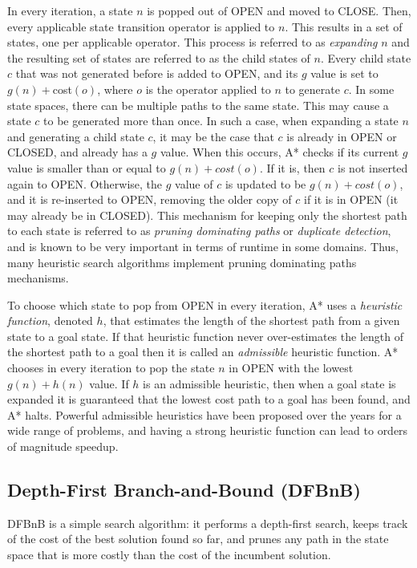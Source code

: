 \documentclass[letterpaper]{article} %
\begin{document}
In every iteration, a state $n$ is popped out of OPEN and moved to CLOSE. Then, every applicable state transition operator is applied to $n$. This results in a set of states, one per applicable operator. This process is referred to as \emph{expanding} $n$ and the resulting set of states are referred to as the child states of $n$.
Every child state $c$ that was not generated before is added to OPEN, and its $g$ value is set to  $g(n)+$cost$(o)$, where $o$ is the operator applied to $n$ to generate $c$.
In some state spaces, there can be multiple paths to the same state.
This may cause a state $c$ to be generated more than once.
In such a case, when expanding a state $n$ and generating a child state $c$, it may be the case that $c$ is already in OPEN or CLOSED, and already has a $g$ value.
When this occurs, A* checks if its current $g$ value is smaller than or equal to $g(n)+cost(o)$. If it is, then $c$ is not inserted again to OPEN. Otherwise, the $g$ value of $c$ is updated to be
$g(n)+cost(o)$, and it is re-inserted to OPEN, removing the older copy of $c$ if it is in OPEN (it may already be in CLOSED).
This mechanism for keeping only the shortest path to each state is referred to as \emph{pruning dominating paths} or \emph{duplicate detection}, and is known to be very important in terms of runtime in some domains. Thus, many heuristic search algorithms implement pruning dominating paths mechanisms.


To choose which state to pop from OPEN in every iteration, A* uses a \emph{heuristic function}, denoted $h$, that estimates the length of the shortest path from a given state to a goal state. If that heuristic function never over-estimates the length of the shortest path to a goal then it is called an \emph{admissible} heuristic function. A* chooses in every iteration to pop the state $n$ in OPEN with the lowest $g(n)+h(n)$ value. If $h$ is an admissible heuristic, then when a goal state is expanded it is guaranteed that the lowest cost path to a goal has been found, and A* halts. Powerful admissible heuristics have been proposed over the years for a wide range of problems, and  having a strong heuristic function can lead to orders of magnitude speedup.


\subsection{Depth-First Branch-and-Bound (DFBnB)}
DFBnB is a simple search algorithm: it performs a depth-first search, keeps track of the cost of the best solution found so far,
and prunes any path in the state space that is more costly than the cost of the incumbent solution.
\end{document}
